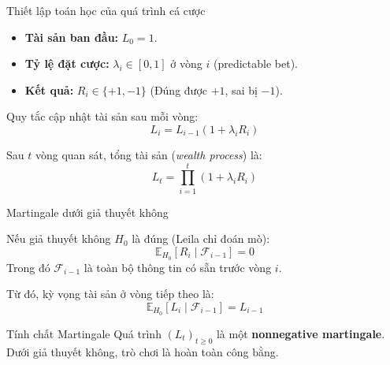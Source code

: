 \begin{frame}{Thiết lập toán học của quá trình cá cược}

\begin{itemize}
    \item \textbf{Tài sản ban đầu:} $L_0 = 1$.
    \item \textbf{Tỷ lệ đặt cược:} $\lambda_i \in [0,1]$ ở vòng $i$ (predictable bet).
    \item \textbf{Kết quả:} $R_i \in \{+1, -1\}$ (Đúng được $+1$, sai bị $-1$).
\end{itemize}

\vspace{0.3cm}
Quy tắc cập nhật tài sản sau mỗi vòng:
\[
L_i = L_{i-1}(1 + \lambda_i R_i)
\]

Sau $t$ vòng quan sát, tổng tài sản (\textit{wealth process}) là:
\[
L_t = \prod_{i=1}^{t} (1 + \lambda_i R_i)
\]

\end{frame}

\begin{frame}{Martingale dưới giả thuyết không}

Nếu giả thuyết không $H_0$ là đúng (Leila chỉ đoán mò):
\[
\mathbb{E}_{H_0}[R_i \mid \mathcal{F}_{i-1}] = 0
\]
Trong đó $\mathcal{F}_{i-1}$ là toàn bộ thông tin có sẵn trước vòng $i$.

Từ đó, kỳ vọng tài sản ở vòng tiếp theo là:
\[
\mathbb{E}_{H_0}[L_i \mid \mathcal{F}_{i-1}] = L_{i-1}
\]

\begin{block}{Tính chất Martingale}
Quá trình $(L_t)_{t\ge 0}$ là một \textbf{nonnegative martingale}. Dưới giả thuyết không, trò chơi là hoàn toàn công bằng.
\end{block}

\end{frame}

